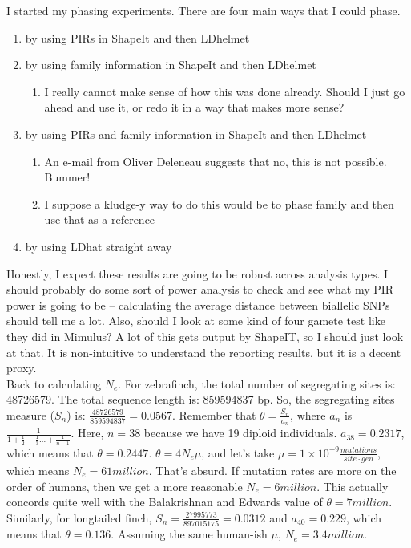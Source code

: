 \documentclass[idxtotoc,hyperref,openany,oneside]{labbook} %
\begin{document}
I started my phasing experiments. There are four main ways that I could phase. 
\begin{enumerate}
\item by using PIRs in ShapeIt and then LDhelmet
\item by using family information in ShapeIt and then LDhelmet
	\begin{enumerate}
	\item I really cannot make sense of how this was done already. Should I just go ahead and use it, or redo it in a way that makes more sense?
	\end{enumerate}
\item by using PIRs and family information in ShapeIt and then LDhelmet 
	\begin{enumerate}
	\item An e-mail from Oliver Deleneau suggests that no, this is not possible. Bummer!
	\item I suppose a kludge-y way to do this would be to phase family and then use that as a reference
	\end{enumerate}
\item by using LDhat straight away
\end{enumerate}
Honestly, I expect these results are going to be robust across analysis types. I should probably do some sort of power analysis to check and see what my PIR power is going to be -- calculating the average distance between biallelic SNPs should tell me a lot. Also, should I look at some kind of four gamete test like they did in Mimulus? A lot of this gets output by ShapeIT, so I should just look at that. It is non-intuitive to understand the reporting results, but it is a decent proxy. \\

Back to calculating $N_e$. For zebrafinch, the total number of segregating sites is: 48726579. The total sequence length is: 859594837 bp. So, the segregating sites measure ($S_n$) is: $\frac{48726579}{859594837} = 0.0567$. Remember that $\theta = \frac{S_n}{a_n}$, where $a_n$ is $\frac{1}{1+\frac{1}{2}+\frac{1}{3} ... + \frac{1}{n - 1}}$. Here, $n=38$ because we have 19 diploid individuals. $a_{38} = 0.2317$, which means that $\theta = 0.2447$. $\theta = 4N_e\mu$, and let's take $\mu = 1 \times 10^{-9} \frac{mutations}{site \cdot gen}$, which means $N_e = 61 million$. That's absurd. If mutation rates are more on the order of humans, then we get a more reasonable $N_e = 6 million$. This actually concords quite well with the Balakrishnan and Edwards value of $\theta=7 million$. Similarly, for longtailed finch, $S_n = \frac{27995773}{897015175} = 0.0312$ and $a_{40} = 0.229$, which means that $\theta = 0.136$. Assuming the same human-ish $\mu$, $N_e = 3.4 million$. \\
\end{document}
